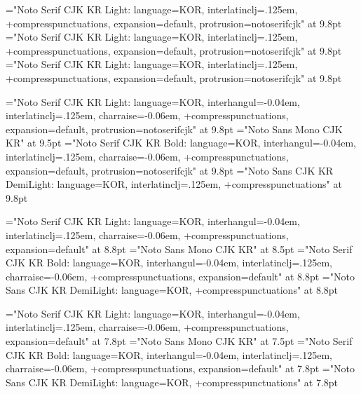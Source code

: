 


%
%

\hangulfont="Noto Serif CJK KR Light:%
  language=KOR,%
  interlatinclj=.125em,%
  +compresspunctuations,%
  expansion=default,%
  protrusion=notoserifcjk" at 9.8pt
\hanjafont="Noto Serif CJK KR Light:%
  language=KOR,%
  interlatinclj=.125em,%
  +compresspunctuations,%
  expansion=default,%
  protrusion=notoserifcjk" at 9.8pt
\fallbackfont="Noto Serif CJK KR Light:%
  language=KOR,%
  interlatinclj=.125em,%
  +compresspunctuations,%
  expansion=default,%
  protrusion=notoserifcjk" at 9.8pt

\sethangulfont\tenmj="Noto Serif CJK KR Light:%
  language=KOR,%
  interhangul=-0.04em,%
  interlatinclj=.125em,%
  charraise=-0.06em,%
  +compresspunctuations,%
  expansion=default,%
  protrusion=notoserifcjk" at 9.8pt
\sethangulfont\tentz="Noto Sans Mono CJK KR" at 9.5pt
\sethangulfont\tenbd="Noto Serif CJK KR Bold:%
  language=KOR,%
  interhangul=-0.04em,%
  interlatinclj=.125em,%
  charraise=-0.06em,%
  +compresspunctuations,%
  expansion=default,%
  protrusion=notoserifcjk" at 9.8pt
\sethangulfont\tensn="Noto Sans CJK KR DemiLight:%
  language=KOR,%
  interlatinclj=.125em,%
  +compresspunctuations" at 9.8pt

\sethangulfont\ninemj="Noto Serif CJK KR Light:%
  language=KOR,%
  interhangul=-0.04em,%
  interlatinclj=.125em,%
  charraise=-0.06em,%
  +compresspunctuations,%
  expansion=default" at 8.8pt
\sethangulfont\ninetz="Noto Sans Mono CJK KR" at 8.5pt
\sethangulfont\ninebd="Noto Serif CJK KR Bold:%
  language=KOR,%
  interhangul=-0.04em,%
  interlatinclj=.125em,%
  charraise=-0.06em,%
  +compresspunctuations,%
  expansion=default" at 8.8pt
\sethangulfont\ninesn="Noto Sans CJK KR DemiLight:%
  language=KOR,%
  +compresspunctuations" at 8.8pt

\sethangulfont\eightmj="Noto Serif CJK KR Light:%
  language=KOR,%
  interhangul=-0.04em,%
  interlatinclj=.125em,%
  charraise=-0.06em,%
  +compresspunctuations,%
  expansion=default" at 7.8pt
\sethangulfont\eighttz="Noto Sans Mono CJK KR" at 7.5pt
\sethangulfont\eightbd="Noto Serif CJK KR Bold:%
  language=KOR,%
  interhangul=-0.04em,%
  interlatinclj=.125em,%
  charraise=-0.06em,%
  +compresspunctuations,%
  expansion=default" at 7.8pt
\sethangulfont\eightsn="Noto Sans CJK KR DemiLight:%
  language=KOR,%
  +compresspunctuations" at 7.8pt

